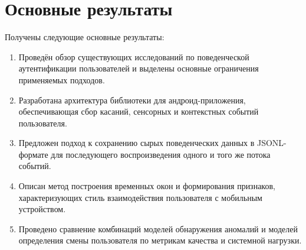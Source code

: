 \documentclass[oneside,senior,etd]{BYUPhys}
\begin{document}


\section{Основные результаты}

Получены следующие основные результаты:

\begin{enumerate}
	\item Проведён обзор существующих исследований по поведенческой аутентификации пользователей и выделены основные ограничения применяемых подходов.
	
	\item Разработана архитектура библиотеки для андроид-приложения, обеспечивающая сбор касаний, сенсорных и контекстных событий пользователя.
	
	\item Предложен подход к сохранению сырых поведенческих данных в JSONL-формате для последующего воспроизведения одного и того же потока событий.
	
	\item Описан метод построения временных окон и формирования признаков, характеризующих стиль взаимодействия пользователя с мобильным устройством.
	
	\item Проведено сравнение комбинаций моделей обнаружения аномалий и моделей определения смены пользователя по метрикам качества и системной нагрузки.
\end{enumerate}

\begingroup
\footnotesize
\raggedright
\nocite{*}


\endgroup
\end{document}
